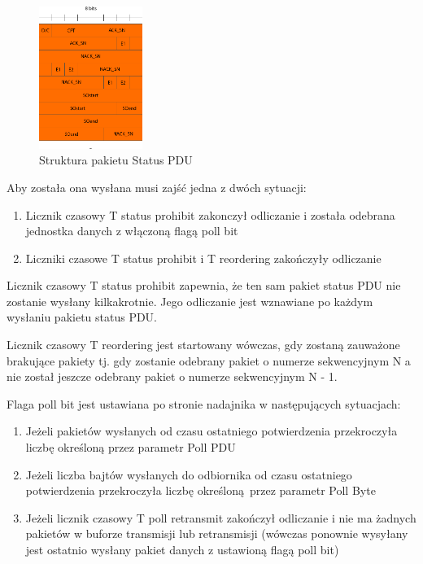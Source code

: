 \begin{figure}
	\centerline{\includegraphics[width=0.3\textwidth]{images/rlc_status_pdu.png}}
	\caption{Struktura pakietu Status PDU}
	\label{fig:status_pdu}
\end{figure}

Aby została ona wysłana musi zajść jedna z dwóch sytuacji:
\begin{enumerate}
	\item Licznik czasowy T status prohibit zakonczył odliczanie i została odebrana jednostka danych z włączoną flagą poll bit
	\item Liczniki czasowe T status prohibit i T reordering zakończyły odliczanie
\end{enumerate}

Licznik czasowy T status prohibit zapewnia, że ten sam pakiet status PDU nie zostanie wysłany kilkakrotnie. Jego odliczanie jest wznawiane po każdym wysłaniu pakietu status PDU.

Licznik czasowy T reordering jest startowany wówczas, gdy zostaną zauważone brakujące pakiety tj. gdy zostanie odebrany pakiet o numerze sekwencyjnym N a nie został jeszcze odebrany pakiet o numerze sekwencyjnym N - 1.

Flaga poll bit jest ustawiana po stronie nadajnika w następujących sytuacjach:
\begin{enumerate}
	\item Jeżeli pakietów wysłanych od czasu ostatniego potwierdzenia przekroczyła liczbę określoną przez parametr Poll PDU
	\item Jeżeli liczba bajtów wysłanych do odbiornika od czasu ostatniego potwierdzenia przekroczyła liczbę określoną przez parametr Poll Byte
	\item Jeżeli licznik czasowy T poll retransmit zakończył odliczanie i nie ma żadnych pakietów w buforze transmisji lub retransmisji (wówczas ponownie wysyłany jest ostatnio wysłany pakiet danych z ustawioną flagą poll bit)
\end{enumerate}